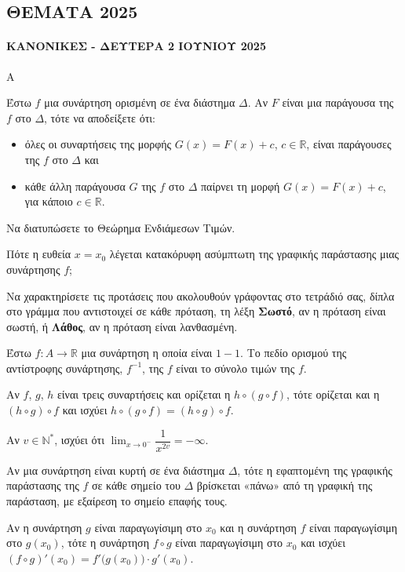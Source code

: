\subsection{ΘΕΜΑΤΑ 2025}
\paragraph{ΚΑΝΟΝΙΚΕΣ - ΔΕΥΤΕΡΑ 2 ΙΟΥΝΙΟΥ 2025}
\begin{thema}{Α}
\begin{erwthma}
    \item Έστω $f$ μια συνάρτηση ορισμένη σε ένα διάστημα $\Delta$. Αν $F$ είναι μια παράγουσα της $f$ στο $\Delta$, τότε να αποδείξετε ότι:
    \begin{itemize}
        \item όλες οι συναρτήσεις της μορφής $G(x) = F(x) + c$, $c \in \mathbb{R}$, είναι παράγουσες της $f$ στο $\Delta$ και
        \item κάθε άλλη παράγουσα $G$ της $f$ στο $\Delta$ παίρνει τη μορφή $G(x) = F(x) + c$, για κάποιο $c \in \mathbb{R}$.
    \end{itemize}

    \item Να διατυπώσετε το Θεώρημα Ενδιάμεσων Τιμών. 

    \item Πότε η ευθεία $x = x_0$ λέγεται κατακόρυφη ασύμπτωτη της γραφικής παράστασης μιας συνάρτησης $f$; 

    \item Να χαρακτηρίσετε τις προτάσεις που ακολουθούν γράφοντας στο τετράδιό σας, δίπλα στο γράμμα που αντιστοιχεί σε κάθε πρόταση, τη λέξη \textbf{Σωστό}, αν η πρόταση είναι σωστή, ή \textbf{Λάθος}, αν η πρόταση είναι λανθασμένη.
    \begin{alist}
        \item Έστω $f: A \to \mathbb{R}$ μια συνάρτηση η οποία είναι $1-1$. Το πεδίο ορισμού της αντίστροφης συνάρτησης, $f^{-1}$, της $f$ είναι το σύνολο τιμών της $f$.

        \item Αν $f$, $g$, $h$ είναι τρεις συναρτήσεις και ορίζεται η $h \circ (g \circ f)$, τότε ορίζεται και η $(h \circ g) \circ f$ και ισχύει $h \circ (g \circ f) = (h \circ g) \circ f$.

        \item Αν $v \in \mathbb{N}^*$, ισχύει ότι $\displaystyle\lim_{x \to 0^-} \dfrac{1}{x^{2v}} = -\infty$.

        \item Αν μια συνάρτηση είναι κυρτή σε ένα διάστημα $\Delta$, τότε η εφαπτομένη της γραφικής παράστασης της $f$ σε κάθε σημείο του $\Delta$ βρίσκεται «πάνω» από τη γραφική της παράσταση, με εξαίρεση το σημείο επαφής τους.

        \item Αν η συνάρτηση $g$ είναι παραγωγίσιμη στο $x_0$ και η συνάρτηση $f$ είναι παραγωγίσιμη στο $g(x_0)$, τότε η συνάρτηση $f \circ g$ είναι παραγωγίσιμη στο $x_0$ και ισχύει $(f \circ g)'(x_0) = f'\bigl(g(x_0)\bigr) \cdot g'(x_0)$.
    \end{alist}
\end{erwthma}
\end{thema}
